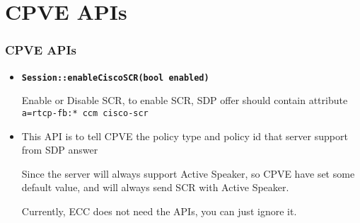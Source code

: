\documentclass{beamer}
\begin{document}
\section{CPVE APIs}
\begin{frame}
  \frametitle{CPVE APIs}
  {\small
  \begin{itemize}
    \setlength\itemsep{1em}
    \item \lstset{basicstyle=\ttfamily}\textbf{\lstinline{Session::enableCiscoSCR(bool enabled)}}

      {\footnotesize
      Enable or Disable SCR, to enable SCR, SDP offer should contain attribute \lstinline{a=rtcp-fb:* ccm cisco-scr}
    }
    \item {}

      {\footnotesize
      This API is to tell CPVE the policy type and policy id that server support from SDP answer 

      Since the server will always support Active Speaker, so CPVE have set some default value, and will always send SCR with Active Speaker. 

      Currently, ECC does not need the APIs, you can just ignore it.
    }

  \end{itemize}
}
\end{frame}
\end{document}
